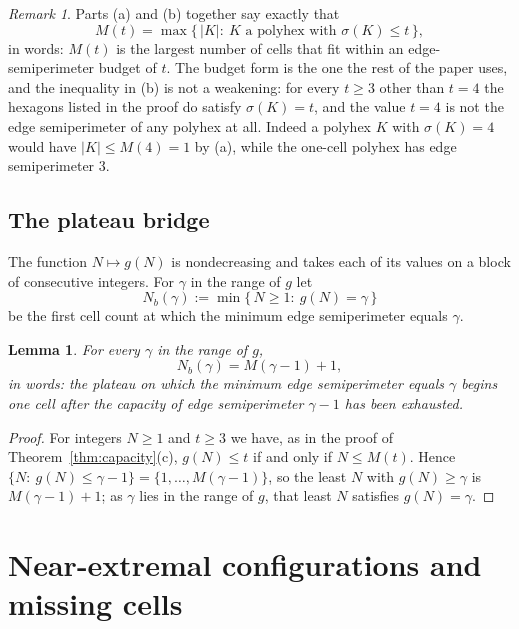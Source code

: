 \documentclass[11pt]{article}
\theoremstyle{plain}
\newtheorem{lemma}[theorem]{Lemma}
\theoremstyle{definition}
\theoremstyle{remark}
\newtheorem{remark}[theorem]{Remark}
\begin{document}
\begin{remark}\label{rem:attain}
Parts (a) and (b) together say exactly that
\[
   M(t)=\max\{\,|K|:\ K\text{ a polyhex with }\sigma(K)\le t\,\},
\]
in words: \(M(t)\) is the largest number of cells that fit within an edge-semiperimeter
budget of \(t\). The budget form is the one the rest of the paper uses, and the
inequality in (b) is not a weakening: for every \(t\ge3\) other than \(t=4\) the
hexagons listed in the proof do satisfy \(\sigma(K)=t\), and the value \(t=4\) is not the
edge semiperimeter of any polyhex at all. Indeed a polyhex \(K\) with \(\sigma(K)=4\)
would have \(|K|\le M(4)=1\) by (a), while the one-cell polyhex has edge semiperimeter
\(3\).
\end{remark}

\subsection{The plateau bridge}\label{sec:2.7}

The function \(N\mapsto g(N)\) is nondecreasing and takes each of its values on a block of
consecutive integers. For \(\gamma\) in the range of \(g\) let
\[
   N_{b}(\gamma):=\min\{\,N\ge1:\ g(N)=\gamma\,\}
\]
be the first cell count at which the minimum edge semiperimeter equals \(\gamma\).

\begin{lemma}\label{lem:bridge}
For every \(\gamma\) in the range of \(g\),
\begin{equation}\label{eq:bridge}
   N_{b}(\gamma)=M(\gamma-1)+1 ,
\end{equation}
in words: the plateau on which the minimum edge semiperimeter equals \(\gamma\) begins one
cell after the capacity of edge semiperimeter \(\gamma-1\) has been exhausted.
\end{lemma}

\begin{proof}
For integers \(N\ge1\) and \(t\ge3\) we have, as in the proof of
Theorem~\ref{thm:capacity}(c), \(g(N)\le t\) if and only if \(N\le M(t)\). Hence
\(\{N:\ g(N)\le\gamma-1\}=\{1,\dots,M(\gamma-1)\}\), so the least \(N\) with
\(g(N)\ge\gamma\) is \(M(\gamma-1)+1\); as \(\gamma\) lies in the range of \(g\), that
least \(N\) satisfies \(g(N)=\gamma\).
\end{proof}




\section{Near-extremal configurations and missing cells}\label{sec:near}
\end{document}
